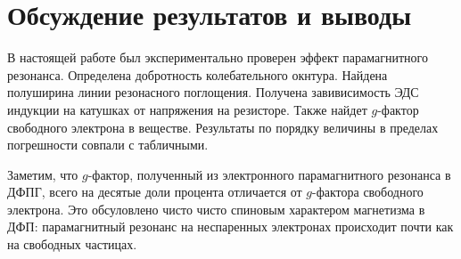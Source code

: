 \documentclass[a4paper,12pt]{article} %
\begin{document}
\newpage
\section{Обсуждение результатов и выводы}
	В настоящей работе был экспериментально проверен эффект парамагнитного резонанса. Определена добротность колебательного окнтура. Найдена полуширина линии резонасного поглощения. Получена завивисимость ЭДС индукции на катушках от напряжения на резисторе. Также найдет $g$-фактор свободного электрона в веществе. Результаты по порядку величины в пределах погрешности совпали с табличными.
	
	Заметим, что $g$-фактор, полученный из электронного парамагнитного резонанса в ДФПГ, всего на десятые доли процента отличается от $g$-фактора свободного электрона. Это обсуловлено чисто чисто спиновым характером магнетизма в ДФП: парамагнитный резонанс на неспаренных электронах происходит почти как на свободных частицах.	
\end{document}

